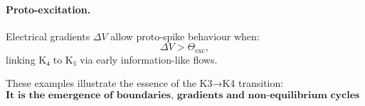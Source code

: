 \paragraph{Proto-excitation.}
Electrical gradients $\Delta V$ allow proto-spike behaviour when:
\[
\Delta V > \Theta_{\mathrm{exc}},
\]
linking K₄ to K₅ via early information-like flows.

These examples illustrate the essence of the K3→K4 transition:
\[
\textbf{It is the emergence of boundaries, gradients and non-equilibrium
cycles — the first form of biological organisation.}
\]
